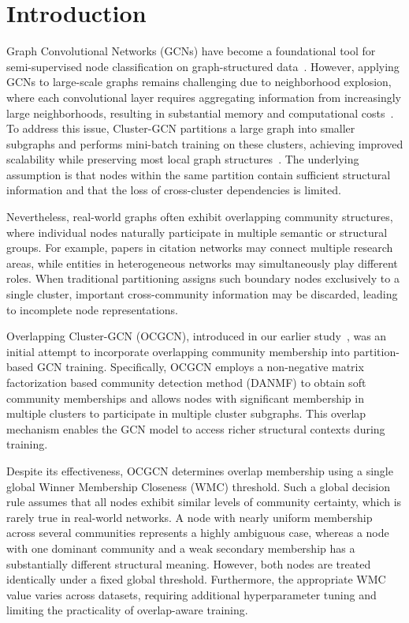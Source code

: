 \documentclass[pdflatex,sn-mathphys-num]{sn-jnl}%
\theoremstyle{thmstyleone}%
\theoremstyle{thmstyletwo}%
\theoremstyle{thmstylethree}%
\begin{document}

\section{Introduction}
\label{sec:introduction}

Graph Convolutional Networks (GCNs) have become a foundational tool for semi-supervised node classification on graph-structured data~\citep{kipf2017semi}.
However, applying GCNs to large-scale graphs remains challenging due to neighborhood explosion, where each convolutional layer requires aggregating information from increasingly large neighborhoods, resulting in substantial memory and computational costs~\citep{Cluster-GCN}.
To address this issue, Cluster-GCN partitions a large graph into smaller subgraphs and performs mini-batch training on these clusters, achieving improved scalability while preserving most local graph structures~\citep{Cluster-GCN}.
The underlying assumption is that nodes within the same partition contain sufficient structural information and that the loss of cross-cluster dependencies is limited.

Nevertheless, real-world graphs often exhibit overlapping community structures, where individual nodes naturally participate in multiple semantic or structural groups.
For example, papers in citation networks may connect multiple research areas, while entities in heterogeneous networks may simultaneously play different roles.
When traditional partitioning assigns such boundary nodes exclusively to a single cluster, important cross-community information may be discarded, leading to incomplete node representations.

Overlapping Cluster-GCN (OCGCN), introduced in our earlier study~\citep{Amintoosi2021}, was an initial attempt to incorporate overlapping community membership into partition-based GCN training.
Specifically, OCGCN employs a non-negative matrix factorization based community detection method (DANMF) to obtain soft community memberships and allows nodes with significant membership in multiple clusters to participate in multiple cluster subgraphs.
This overlap mechanism enables the GCN model to access richer structural contexts during training.

Despite its effectiveness, OCGCN determines overlap membership using a single global Winner Membership Closeness (WMC) threshold.
Such a global decision rule assumes that all nodes exhibit similar levels of community certainty, which is rarely true in real-world networks.
A node with nearly uniform membership across several communities represents a highly ambiguous case, whereas a node with one dominant community and a weak secondary membership has a substantially different structural meaning.
However, both nodes are treated identically under a fixed global threshold.
Furthermore, the appropriate WMC value varies across datasets, requiring additional hyperparameter tuning and limiting the practicality of overlap-aware training.
\end{document}
